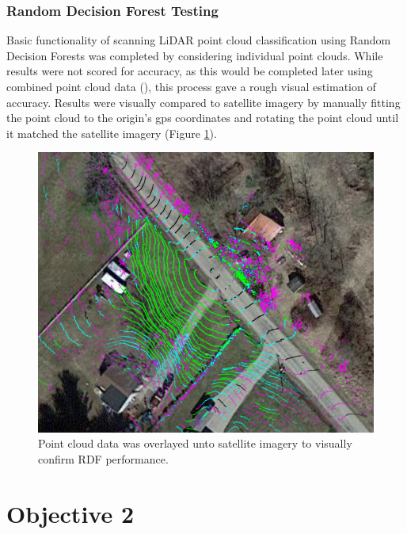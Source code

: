 \documentclass[numbered,pdftex]{ohio-etd}
\begin{document}
{{{{			} %
				
				
			\subsubsection{Random Decision Forest Testing}{
			
				{Basic functionality of scanning LiDAR point cloud classification using Random Decision Forests was completed by considering individual point clouds. While results were not scored for accuracy, as this would be completed later using combined point cloud data (), this process gave a rough visual estimation of accuracy. Results were visually compared to satellite imagery by manually fitting the point cloud to the origin's gps coordinates and rotating the point cloud until it matched the satellite imagery (Figure \ref{fig:all_feat_overlay}). }
				
				\begin{figure}[H]
					\centering
					\includegraphics[width=0.7\linewidth]{Defense_Images/all_feat_overlay}
					\caption[Classified Single Point Cloud]{Point cloud data was overlayed unto satellite imagery to visually confirm RDF performance.}
					\label{fig:all_feat_overlay}
				\end{figure}

				
				
			} %
				
		} %

	} %


\newpage
	
	\section{Objective 2}\label{sec:objective-2}
	
}
\end{document}
